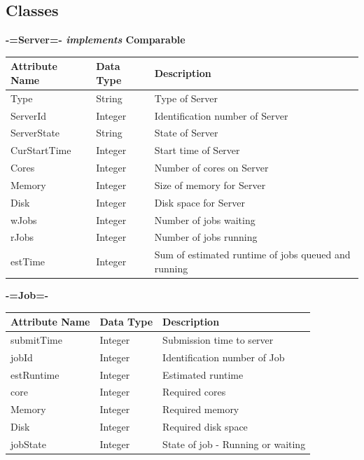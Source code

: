 \documentclass[a4paper]{article} %
\begin{document}
\subsection*{Classes}
\textbf{-=Server=- \textit{implements} Comparable}
\begin{flushleft}
    \begin{tabular}{|l|l|l|}
        \hline
        \textbf{Attribute Name} & \textbf{Data Type} & \textbf{Description} \\
        \hline
        Type & String & Type of Server \\
        \hline
        ServerId & Integer & Identification number of Server\\
        \hline
        ServerState & String & State of Server\\
        \hline
        CurStartTime & Integer & Start time of Server\\
        \hline
        Cores & Integer & Number of cores on Server\\
        \hline
        Memory & Integer & Size of memory for Server\\
        \hline
        Disk & Integer & Disk space for Server\\
        \hline
        wJobs & Integer & Number of jobs waiting\\
        \hline
        rJobs & Integer & Number of jobs running\\
        \hline
        estTime & Integer & Sum of estimated runtime of jobs queued and running\\
        \hline
    \end{tabular}
\end{flushleft}

\textbf{-=Job=-}
\begin{flushleft}
    \begin{tabular}{|l|l|l|}
        \hline
        \textbf{Attribute Name} & \textbf{Data Type} & \textbf{Description} \\
        \hline
        submitTime & Integer & Submission time to server\\
        \hline
        jobId & Integer & Identification number of Job\\
        \hline
        estRuntime & Integer & Estimated runtime\\
        \hline
        core & Integer & Required cores\\
        \hline
        Memory & Integer & Required memory\\
        \hline
        Disk & Integer & Required disk space\\
        \hline
        jobState & Integer & State of job - Running or waiting\\
        \hline
    \end{tabular}
\end{flushleft}
\end{document}
